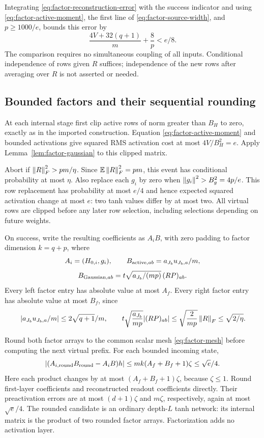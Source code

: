 Integrating \eqref{eq:factor-reconstruction-error} with the success
indicator and using \eqref{eq:factor-active-moment}, the first line of
\eqref{eq:factor-source-width}, and $p\ge1000/e$, bounds this error by
\[
 \frac{4V+32(q+1)}m+\frac8p<e/8.
\]
The comparison requires no simultaneous coupling of all inputs.
Conditional independence of rows given $R$ suffices; independence of the
new rows after averaging over $R$ is not asserted or needed.

\subsection{Bounded factors and their sequential rounding}

At each internal stage first clip active rows of norm greater than $B_H$
to zero, exactly as in the imported construction. Equation
\eqref{eq:factor-active-moment} and bounded activations give squared RMS
activation cost at most $4V/B_H^2=e$. Apply
Lemma~\ref{lem:factor-gaussian} to this clipped matrix.

Abort if $\left\|R\right\|_F^2>pm/\eta$. Since $\mathbb E\left\|R\right\|_F^2=pm$, this event
has conditional probability at most $\eta$. Also replace each $g_i$ by
zero when $\left\|g_i\right\|^2>B_g^2=4p/e$. This row replacement has probability
at most $e/4$ and hence expected squared activation change at most $e$:
two tanh values differ by at most two. All virtual rows are clipped before
any later row selection, including selections depending on future weights.

On success, write the resulting coefficients as $A_iB$, with zero padding
to factor dimension $k=q+p$, where
\[
 A_i=(H_{0,i},g_i),\qquad
 B_{{\rm active},ab}=a_{J_b}u_{J_b,a}/m,
\]
\[
 B_{{\rm Gaussian},ab}
       =t\sqrt{a_{J_b}/(mp)}\,(RP)_{ab}.
\]
Every left factor entry has absolute value at most $A_f$. Every right
factor entry has absolute value at most $B_f$, since
\[
 |a_{J_b}u_{J_b,a}/m|\le2\sqrt{q+1}/m,
\qquad
 t\sqrt{\frac{a_{J_b}}{mp}}|(RP)_{ab}|
 \le\sqrt{\frac2{mp}}\left\|R\right\|_F\le\sqrt{2/\eta}.
\]

Round both factor arrays to the common scalar mesh \eqref{eq:factor-mesh}
before computing the next virtual prefix. For each bounded incoming state,
\begin{equation}\label{eq:factor-rounding-injection}
 |(A_{i,\rm round}B_{\rm round}-A_iB)h|
 \le mk(A_f+B_f+1)\zeta\le\sqrt e/4.
\end{equation}
Here each product changes by at most
$(A_f+B_f+1)\zeta$, because $\zeta\le1$.
Round first-layer coefficients and reconstructed readout coefficients
directly. Their preactivation errors are at most $(d+1)\zeta$ and
$m\zeta$, respectively, again at most $\sqrt e/4$.
The rounded candidate is an ordinary depth-$L$ tanh network: its internal
matrix is the product of two rounded factor arrays. Factorization adds
no activation layer.

